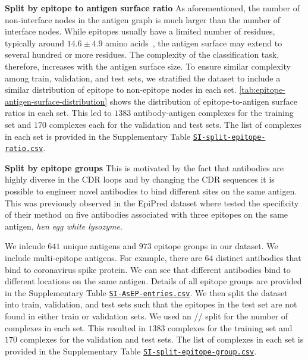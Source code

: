 \documentclass[11pt]{article}
\begin{document}
\textbf{Split by epitope to antigen surface ratio} As aforementioned, the number of non-interface nodes in the antigen graph is much larger than the number of interface nodes.
While epitopes usually have a limited number of residues, typically around $14.6 \pm 4.9$ amino acids~\citep{abagInterfaceAnalysis}, the antigen surface may extend to several hundred or more residues.
The complexity of the classification task, therefore, increases with the antigen surface size.
To ensure similar complexity among train, validation, and test sets, we stratified the dataset to include a similar distribution of epitope to non-epitope nodes in each set.
\cref{tab:epitope-antigen-surface-distribution} shows the distribution of epitope-to-antigen surface ratios in each set.
This led to $1383$ antibody-antigen complexes for the training set and $170$ complexes each for the validation and test sets.
The list of complexes in each set is provided in the Supplementary Table \href{https://zenodo.org/records/14013579/files/SI-split-epitope-ratio.csv}{\texttt{SI-split-epitope-ratio.csv}}.

\textbf{Split by epitope groups} This is motivated by the fact that antibodies are highly diverse in the CDR loops and by changing the CDR sequences it is possible to engineer novel antibodies to bind different sites on the same antigen. This was previously observed in the EpiPred dataset where \citet{epipred} tested the specificity of their method on five antibodies associated with three epitopes on the same antigen, \textit{hen egg white lysozyme}.

We inlcude $641$ unique antigens and $973$ epitope groups in our dataset. We include multi-epitope antigens. For example, there are $64$ distinct antibodies that bind to coronavirus spike protein. We can see that different antibodies bind to different locations on the same antigen. Details of all epitope groups are provided in the Supplementary Table \href{https://zenodo.org/records/14013579/files/SI-AsEP-entries.csv}{\texttt{SI-AsEP-entries.csv}}. We then split the dataset into train, validation, and test sets such that the epitopes in the test set are not found in either train or validation sets. We used an // split for the number of complexes in each set. This resulted in $1383$ complexes for the training set and $170$ complexes for the validation and test sets. The list of complexes in each set is provided in the Supplementary Table \href{https://zenodo.org/records/14013579/files/SI-split-epitope-group.csv}{\texttt{SI-split-epitope-group.csv}}.
\end{document}
